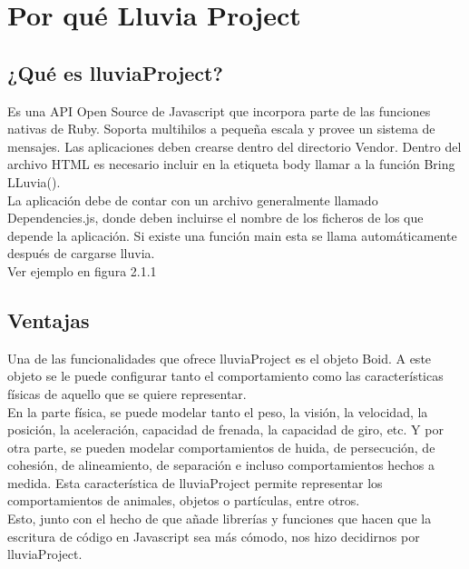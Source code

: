\section{Por qué Lluvia Project}
\label{section:por_que}

\subsection{¿Qué es lluviaProject?}
\label{subsection:que_es}

Es una API Open Source de Javascript que incorpora parte de las funciones nativas de Ruby. Soporta multihilos a pequeña escala y provee un 
sistema de mensajes. Las aplicaciones deben crearse dentro del directorio Vendor. Dentro del archivo HTML es necesario incluir en la 
etiqueta body llamar a la función Bring LLuvia().\\

La aplicación debe de contar con un archivo generalmente llamado Dependencies.js, donde deben incluirse el nombre de los ficheros de los que 
depende la aplicación. Si existe una función main esta se llama automáticamente después de cargarse lluvia.\\

Ver ejemplo en figura 2.1.1


\subsection{Ventajas}
\label{subsection:ventajas}


Una de las funcionalidades que ofrece lluviaProject es el objeto Boid. A este objeto se le puede configurar tanto el comportamiento como las 
características físicas de aquello que se quiere representar.\\

En la parte física, se puede modelar tanto el peso, la visión, la velocidad, la posición, la aceleración, capacidad de frenada, la capacidad 
de giro, etc. Y por otra parte, se pueden modelar comportamientos de huida, de persecución, de cohesión, de alineamiento, de separación e 
incluso comportamientos hechos a medida. Esta característica de lluviaProject permite representar los comportamientos de animales, objetos 
o partículas, entre otros.\\

Esto, junto con el hecho de que añade librerías y funciones que hacen que la escritura de código en Javascript sea más cómodo, nos hizo 
decidirnos por lluviaProject.\\
